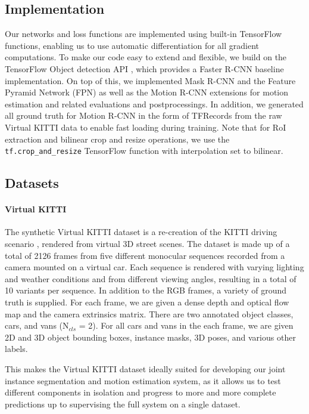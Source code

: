 \subsection{Implementation}
Our networks and loss functions are implemented using built-in TensorFlow \cite{TensorFlow}
functions, enabling us to use automatic differentiation for all gradient
computations. To make our code easy to extend and flexible, we build on
the TensorFlow Object detection API \cite{TensorFlowObjectDetection}, which provides a Faster R-CNN baseline
implementation.
On top of this, we implemented Mask R-CNN and the Feature Pyramid Network (FPN)
as well as the Motion R-CNN extensions for motion estimation and related evaluations
and postprocessings. In addition, we generated all ground truth for
Motion R-CNN in the form of TFRecords from the raw Virtual KITTI
data to enable fast loading during training.
Note that for RoI extraction and bilinear crop and resize operations,
we use the \texttt{tf.crop\_and\_resize} TensorFlow function with
interpolation set to bilinear.

\subsection{Datasets}
\label{ssec:datasets}

\paragraph{Virtual KITTI}
The synthetic Virtual KITTI dataset \cite{VKITTI} is a re-creation of the KITTI
driving scenario \cite{KITTI2012, KITTI2015}, rendered from virtual 3D street
scenes.
The dataset is made up of a total of 2126 frames from five different monocular
sequences recorded from a camera mounted on a virtual car.
Each sequence is rendered with varying lighting and weather conditions and
from different viewing angles, resulting in a total of 10 variants per sequence.
In addition to the RGB frames, a variety of ground truth is supplied.
For each frame, we are given a dense depth and optical flow map and the camera
extrinsics matrix. There are two annotated object classes, cars, and vans (N$_{cls}$ = 2).
For all cars and vans in the each frame, we are given 2D and 3D object bounding
boxes, instance masks, 3D poses, and various other labels.

This makes the Virtual KITTI dataset ideally suited for developing our joint
instance segmentation and motion estimation system, as it allows us to test
different components in isolation and progress to more and more complete
predictions up to supervising the full system on a single dataset.

